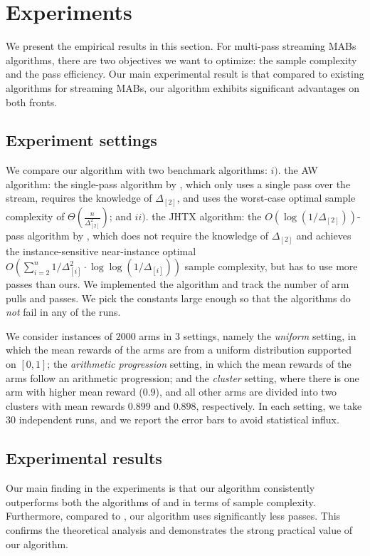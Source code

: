 \section{Experiments}
\label{sec:experiment}
We present the empirical results in this section. For multi-pass streaming MABs algorithms, there are two objectives we want to optimize: the sample complexity and the pass efficiency. Our main experimental result is that compared to existing algorithms for streaming MABs, our algorithm exhibits significant advantages on both fronts.

\subsection{Experiment settings} 
We compare our algorithm with two benchmark algorithms: $i).$ the AW algorithm: the single-pass algorithm by \cite{AssadiW20}, which only uses a single pass over the stream, requires the knowledge of $\Delta_{[2]}$, and uses the worst-case optimal sample complexity of $\Theta(\frac{n}{\Delta^2_{[2]}})$; and $ii).$ the JHTX algorithm: the $O(\log(1/\Delta_{[2]}))$-pass algorithm by \cite{JinH0X21}, which does not require the knowledge of $\Delta_{[2]}$ and achieves the instance-sensitive near-instance optimal $O(\sum_{i=2}^{n}1/\Delta^2_{[i]}\cdot \log\log(1/\Delta_{[i]}))$ sample complexity, but has to use more passes than ours. We implemented the algorithm and track the number of arm pulls and passes. We pick the constants large enough so that the algorithms do \emph{not} fail in any of the runs.

We consider instances of $2000$ arms in $3$ settings, namely the \emph{uniform} setting, in which the mean rewards of the arms are from a uniform distribution supported on $[0,1]$; the \emph{arithmetic progression} setting, in which the mean rewards of the arms follow an arithmetic progression; and the \emph{cluster} setting, where there is one arm with higher mean reward ($0.9$), and all other arms are divided into two clusters with mean rewards $0.899$ and $0.898$, respectively. In each setting, we take $30$ independent runs, and we report the error bars to avoid statistical influx. 

\subsection{Experimental results}
Our main finding in the experiments is that our algorithm consistently outperforms both the algorithms of \cite{AssadiW20} and \cite{JinH0X21} in terms of sample complexity. Furthermore, compared to \cite{JinH0X21}, our algorithm uses significantly less passes. This confirms the theoretical analysis and demonstrates the strong practical value of our algorithm.
